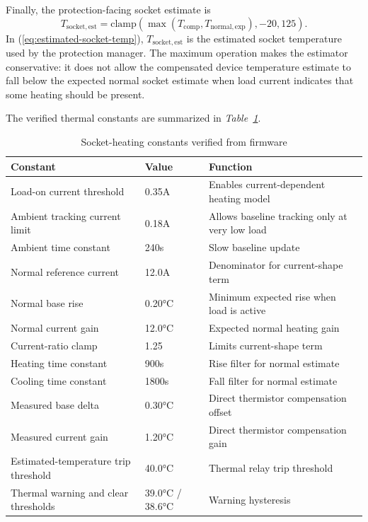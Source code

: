 Finally, the protection-facing socket estimate is
\begin{equation}
  T_{\mathrm{socket,est}} =
  \mathrm{clamp}
  \left(
  \max\left(T_{\mathrm{comp}}, T_{\mathrm{normal,exp}}\right),
  -20,
  125
  \right).
  \label{eq:estimated-socket-temp}
\end{equation}
In (\ref{eq:estimated-socket-temp}), $T_{\mathrm{socket,est}}$ is the
estimated socket temperature used by the protection manager. The maximum
operation makes the estimator conservative: it does not allow the compensated
device temperature estimate to fall below the expected normal socket estimate when load
current indicates that some heating should be present.

The verified thermal constants are summarized in
\textit{Table~\ref{tab:ch3-thermal-constants}}.

\begin{table}[H]
  \centering
  \caption{Socket-heating constants verified from firmware}
  \label{tab:ch3-thermal-constants}
  \begin{tabular}{p{}p{}p{}}
    \toprule
    \textbf{Constant} & \textbf{Value} & \textbf{Function} \\
    \midrule
    Load-on current threshold & 0.35A & Enables current-dependent heating model \\
    Ambient tracking current limit & 0.18A & Allows baseline tracking only at very low load \\
    Ambient time constant & 240s & Slow baseline update \\
    Normal reference current & 12.0A & Denominator for current-shape term \\
    Normal base rise & 0.20°C & Minimum expected rise when load is active \\
    Normal current gain & 12.0°C & Expected normal heating gain \\
    Current-ratio clamp & 1.25 & Limits current-shape term \\
    Heating time constant & 900s & Rise filter for normal estimate \\
    Cooling time constant & 1800s & Fall filter for normal estimate \\
    Measured base delta & 0.30°C & Direct thermistor compensation offset \\
    Measured current gain & 1.20°C & Direct thermistor compensation gain \\
    Estimated-temperature trip threshold & 40.0°C & Thermal relay trip threshold \\
    Thermal warning and clear thresholds & 39.0°C / 38.6°C & Warning hysteresis \\
    \bottomrule
  \end{tabular}
\end{table}

